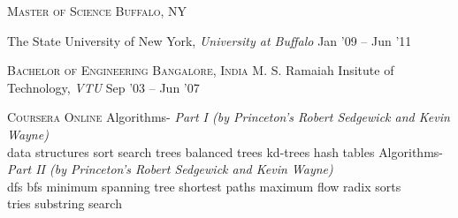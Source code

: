 \documentclass[10pt,a4paper]{article} %
\begin{document}
\spacedhrule{0.5em}{-0.4em} %

\headedsection %
{\textsc{Master of Science}}
{\textsc{Buffalo, NY}} {

  \headedsubsection %
	{The State University of New York, \textit{University at Buffalo}} 
	{Jan '09 -- Jun '11} { }
}


\headedsection %
{\textsc{Bachelor of Engineering}}
{\textsc{Bangalore, India}} {
  \headedsubsection %
  {M. S. Ramaiah Insitute of Technology, \textit{VTU}}
  {Sep '03 -- Jun '07} {}
}


\headedsection %
{\textsc{Coursera}} {\textsc{Online}} {
  \headedsubsection %
  {Algorithms- \textit{Part I (by Princeton's Robert Sedgewick and Kevin Wayne)}}
  {} {
	\\
	\bull data structures \bull sort \bull search \bull trees
	\bull balanced trees \bull kd-trees \bull hash tables
  }
  \headedsubsection %
  {Algorithms- \textit{Part II (by Princeton's Robert Sedgewick and Kevin Wayne)}}
  {} {
	\\
  	\bull dfs \bull bfs \bull minimum spanning tree \bull shortest paths
	\bull maximum flow \bull radix sorts\\
	\bull tries \bull substring search
  }
}

\spacedhrule{0.5em}{-0.4em} %

\end{document}
